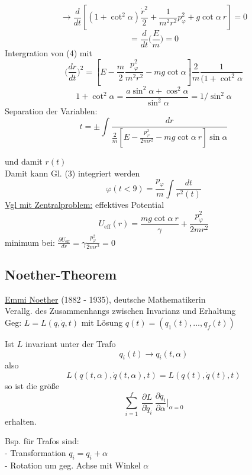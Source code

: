 \documentclass[titlepage,12pt,a4paper,ngerman]{report}
\newcommand{\tx}[1]{\textrm{#1}}
\newcommand{\summ}[2]{\sum_{#1}^{#2}}
\newcommand{\frbox}[2]{\begin{tcolorbox}[colback=white,colframe=red!75!black,fonttitle=\bfseries,title=#1]#2\end{tcolorbox}} %
\begin{document}
{\begin{enumerate}
	$$\rightarrow \frac{d}{dt} [(1 + \cot^2 \alpha) \frac{\dot r^2}{2} + \frac{1}{m^2 r^2} p_\varphi^2 + g \cot \alpha\ r ] = 0$$
	$$ = \frac{d}{dt} \bigg(\frac{E}{m}\bigg) = 0$$
	Intergration von (4) mit
	$$\bigg(\frac{dr}{dt}\bigg)^2 = [E - \frac{m}{2} \frac{p_\varphi^2}{m^2 r^2} - mg \cot \alpha] \frac{2}{m}\frac{1}{(1+\cot^2 \alpha}$$
	$$1 + \cot^2 \alpha = \frac{a\sin^2 \alpha + \cos^2 \alpha}{\sin^2 \alpha}= 1/\sin^2 \alpha$$
	Separation der Variablen:
	\begin{equation*}
	t = \pm \int \frac{dr}{\frac{2}{m} [E- \frac{p_\varphi^2}{2mr^2}-mg \cot \alpha\ r]\sin \alpha}	\tag*{(5)}
	\end{equation*}
\end{enumerate}
und damit $r(t)$\\
Damit kann Gl. (3) integriert werden
\begin{equation*}
\varphi(t<9) = \frac{p_\varphi}{m} \int \frac{dt}{r^2(t)} \tag{6}
\end{equation*}
\underline{Vgl mit Zentralproblem:} effektives Potential
$$U_{\tx{eff}}(r) = \frac{mg \cot \alpha\ r}{\gamma} + \frac{p_\varphi^2}{2mr^2}$$
minimum bei: $\frac{\partial U_{\tx{eff}}}{dr} = \gamma \frac{p_\varphi^2}{2mr^3} = 0$

\subsection{Noether-Theorem}
\setcounter{equation}{0}
\underline{Emmi Noether} (1882 - 1935), deutsche Mathematikerin\\
Verallg. des Zusammenhangs zwischen Invarianz und Erhaltung\\
Geg: $ L = L(q, \dot q, t)$ mit Lösung $q(t) = (q_1(t), \dots, q_f(t))$\\

\frbox{\tx{,,Noether Theorem``}}{Ist $L$ invariant unter der Trafo
	\begin{equation}\label{nt:1}
	q_i (t) \rightarrow q_i (t,\alpha) \tag*{(1)}
	\end{equation}
	also
	\begin{equation}\label{nt:2}
	L (q(t, \alpha), \dot q(t,\alpha),t) = L(q(t),\dot q (t),t) \tag*{(2)}
	\end{equation}
	so ist die größe 
	\begin{equation}\label{nt:3}
	\summ{i=1}{f}\ \frac{\partial L}{\partial\dot q_i}\ \frac{\partial q_i}{\partial \alpha}\bigg|_{\alpha=0} \tag*{(3)}
	\end{equation}
	erhalten.
}
\noindent Bsp. für Trafos sind:\\
\indent - Transformation $q_i = q_i + \alpha$\\
\indent - Rotation um geg. Achse mit Winkel $\alpha$\\
}
\end{document}
